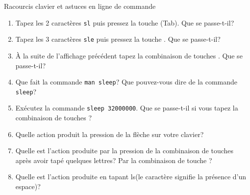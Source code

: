 \begin{exercice}
  \begin{exercicelet}{Racourcis clavier et astuces en ligne de commande}
    \begin{enumerate}\setcounter{enumi}{\value{cnti}}
      \setcounter{cnti}{\value{enumi}}
    \item Tapez les 2 caractères \texttt{sl} puis pressez la touche \Tab
      (Tab). Que se passe-t-il?
    \item Tapez les 3 caractères \texttt{sle} puis pressez la touche
      \Tab. Que se passe-t-il?
    \item À la suite de l'affichage précédent tapez la combinaison de
      touches \Ctrl{}. Que se passe-t-il?
    \item Que fait la commande \texttt{man sleep}? Que pouvez-vous dire
      de la commande \texttt{sleep}?
    \item Exécutez la commande \texttt{sleep 32000000}. Que se
      passe-t-il si vous tapez la combinaison de touches
      \Ctrl{}?
    \item Quelle action produit la pression de la flèche \UArrow sur
      votre clavier?
    \item Quelle est l'action produite par la pression de la combinaison
      de touches \Ctrl{} après avoir tapé quelques lettres?
      Par la combinaison de touche \Ctrl{}?
    \item Quelle est l'action produite en tapant ls\Spacebar\Tab (le
      caractère \Spacebar signifie la présence d'un espace)?
    \end{enumerate}
  \end{exercicelet}
\end{exercice}

